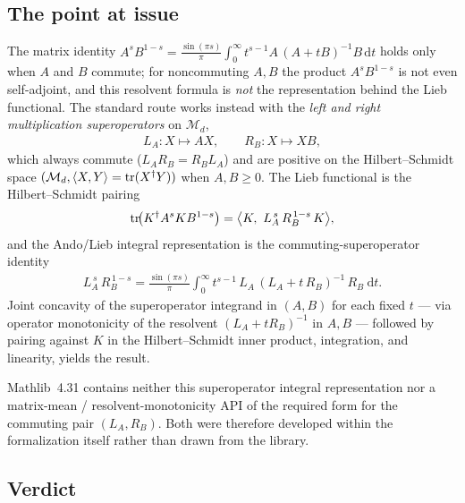 \documentclass{article}
\begin{document}
\subsection{The point at issue}\label{ssec:lieb-gap}

The matrix identity
$A^s B^{1-s}=\tfrac{\sin(\pi s)}{\pi}\int_0^\infty t^{s-1}A\,(A+tB)^{-1}B\,\mathrm dt$
holds only when $A$ and $B$ commute; for noncommuting $A,B$ the product
$A^sB^{1-s}$ is not even self-adjoint, and this resolvent formula is \emph{not}
the representation behind the Lieb functional.  The standard route works instead
with the \emph{left and right multiplication superoperators} on $\mathcal M_d$,
\begin{align}
  L_A : X \longmapsto AX, \qquad R_B : X \longmapsto XB,
\end{align}
which always commute ($L_A R_B = R_B L_A$) and are positive on the
Hilbert--Schmidt space $(\mathcal M_d,\langle X,Y\rangle = \operatorname{tr}(X^\dagger Y))$
when $A,B\ge 0$.  The Lieb functional is the Hilbert--Schmidt pairing
\begin{align}
  \operatorname{tr}\!\bigl(K^\dagger A^s K B^{1-s}\bigr)
    = \bigl\langle K,\ L_A^{\,s}\,R_B^{\,1-s}\,K\bigr\rangle,
\end{align}
and the Ando/Lieb integral representation is the commuting-superoperator identity
\begin{align}
  L_A^{\,s}\,R_B^{\,1-s}
    = \frac{\sin(\pi s)}{\pi}\int_0^\infty t^{s-1}\,
      L_A\,(L_A + t\,R_B)^{-1}\,R_B\ \mathrm dt .
\end{align}
Joint concavity of the superoperator integrand in $(A,B)$ for each fixed $t$ ---
via operator monotonicity of the resolvent $(L_A+tR_B)^{-1}$ in $A,B$ --- followed
by pairing against $K$ in the Hilbert--Schmidt inner product, integration, and
linearity, yields the result.

Mathlib~4.31 contains neither this superoperator integral representation nor a
matrix-mean / resolvent-monotonicity API of the required form for the commuting
pair $(L_A,R_B)$.  Both were therefore developed within the formalization
itself rather than drawn from the library.

\subsection{Verdict}
\end{document}
